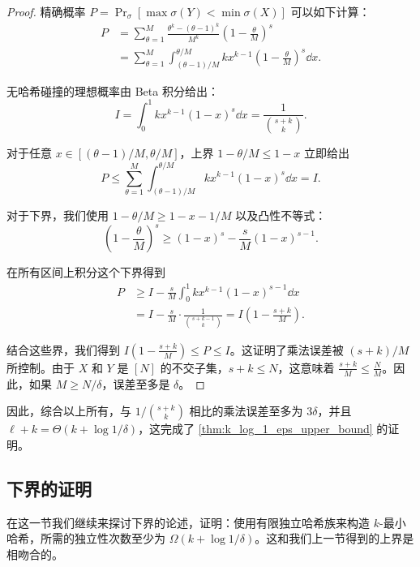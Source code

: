 \begin{proof}
    精确概率 $P = \Pr_{\sigma}\left[ \max \sigma(Y) < \min \sigma(X) \right]$ 可以如下计算：
    \begin{align*}
        P & = \sum_{\theta = 1}^M \frac{\theta^k - (\theta - 1)^k}{M^k} \left( 1 - \frac{\theta}{M} \right)^s \\
         & = \sum_{\theta = 1}^M \int_{(\theta - 1) / M}^{\theta / M} k x^{k-1} \left( 1 - \frac{\theta}{M} \right)^s \dd x.
    \end{align*}
    
    无哈希碰撞的理想概率由 Beta 积分给出：
    $$
    I = \int_0^1 k x^{k-1} (1-x)^s \dd x = \frac{1}{\binom{s+k}{k}}.
    $$
    
    对于任意 $x \in [(\theta - 1) / M, \theta / M]$，上界 $1 - \theta / M \le 1 - x$ 立即给出
    $$
    P \le \sum_{\theta = 1}^M \int_{(\theta - 1) / M}^{\theta / M} k x^{k-1} (1-x)^s \dd x = I.
    $$
    
    对于下界，我们使用 $1 - \theta / M \ge 1 - x - 1 / M$ 以及凸性不等式：
    $$
    \left( 1 - \frac{\theta}{M} \right)^s \ge (1-x)^s - \frac{s}{M}(1-x)^{s-1}.
    $$
    
    在所有区间上积分这个下界得到
    \begin{align*}
        P & \ge I - \frac{s}{M} \int_0^1 k x^{k-1}(1-x)^{s-1} \dd x \\
         & = I - \frac{s}{M} \cdot \frac{1}{\binom{s + k - 1}{k}} = I \left( 1 - \frac{s + k}{M} \right).
    \end{align*}
    
    结合这些界，我们得到 $I \left( 1 - \frac{s+k}{M} \right) \le P \le I$。这证明了乘法误差被 $(s + k) / M$ 所控制。由于 $X$ 和 $Y$ 是 $[N]$ 的不交子集，$s+k \le N$，这意味着 $\frac{s+k}{M} \le \frac{N}{M}$。因此，如果 $M \ge N / \delta$，误差至多是 $\delta$。
\end{proof}

因此，综合以上所有，与 $1 / \binom{s + k}{k}$ 相比的乘法误差至多为 $3 \delta$，并且 $\ell + k = \Theta(k + \log 1 / \delta)$，这完成了 \cref{thm:k_log_1_eps_upper_bound} 的证明。

\subsection{下界的证明}\label{sec:lower_bound}

在这一节我们继续来探讨下界的论述，证明：使用有限独立哈希族来构造 $k$-最小哈希，所需的独立性次数至少为 $\Omega(k + \log 1 / \delta)$。这和我们上一节得到的上界是相吻合的。

